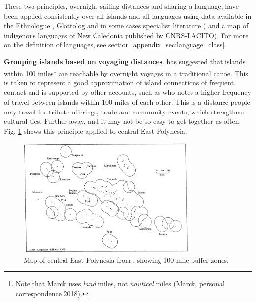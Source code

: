 \documentclass[unnumsec,webpdf,modern,medium]{oup-authoring-template}
\begin{document}
These two principles, overnight sailing distances and sharing a language, have been applied consistently over all islands and all languages using data available in the Ethnologue \citep{ethnologue22}, Glottolog \citep{glottolog3} and in some cases specialist literature (\citet{faaniu1983tuvalu,charpentier2012linguistic, francoisetatl2015, macdonald_2020, omniglot_tuvaluan} and a map of indigenous languages of New Caledonia published by CNRS-LACITO). For more on the definition of languages, see section \ref{appendix_sec:language_class}.




\textbf{Grouping islands based on voyaging distances}. \citet{mark_1986, marck2000} has suggested that islands within 100 miles\footnote{Note that Marck uses \emph{land} miles, not \emph{nautical} miles (Marck, personal correspondence 2018).} are reachable by overnight voyages in a traditional canoe. This is taken to represent a good approximation of island connections of frequent contact and is supported by other accounts, such as \citep[38]{gladwin2009east} who notes a higher frequency of travel between islands within 100 miles of each other. This is a distance people may travel for tribute offerings, trade and community events, which strengthens cultural ties. Further away, and it may not be so easy to get together as often. Fig. \ref{appendix_Marck_2000_east_poly} shows this principle applied to central East Polynesia.

\begin{figure}[ht]
\centering
\includegraphics[width=0.8\textwidth]{Marck_2000_east_poly}
\caption{{Map of central East Polynesia from \citet{marck2000}, showing 100 mile buffer zones.}}
\label{appendix_Marck_2000_east_poly}
\end{figure}
\end{document}
